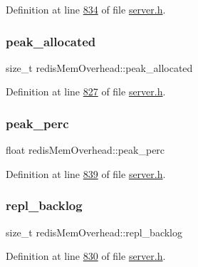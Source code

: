 Definition at line \hyperlink{server_8h_source_l00834}{834} of file \hyperlink{server_8h_source}{server.\+h}.

\mbox{\label{structredisMemOverhead_aa397973acd81e9852d13cfd9e31805a7}} 
\subsubsection{\texorpdfstring{peak\+\_\+allocated}{peak\_allocated}}
{\footnotesize\ttfamily size\+\_\+t redis\+Mem\+Overhead\+::peak\+\_\+allocated}



Definition at line \hyperlink{server_8h_source_l00827}{827} of file \hyperlink{server_8h_source}{server.\+h}.

\mbox{\label{structredisMemOverhead_a41bf9114b4f9e2a77550abe4bececbc7}} 
\subsubsection{\texorpdfstring{peak\+\_\+perc}{peak\_perc}}
{\footnotesize\ttfamily float redis\+Mem\+Overhead\+::peak\+\_\+perc}



Definition at line \hyperlink{server_8h_source_l00839}{839} of file \hyperlink{server_8h_source}{server.\+h}.

\mbox{\label{structredisMemOverhead_a224b42197456fc805e32a161d9c0ea1d}} 
\subsubsection{\texorpdfstring{repl\+\_\+backlog}{repl\_backlog}}
{\footnotesize\ttfamily size\+\_\+t redis\+Mem\+Overhead\+::repl\+\_\+backlog}



Definition at line \hyperlink{server_8h_source_l00830}{830} of file \hyperlink{server_8h_source}{server.\+h}.

